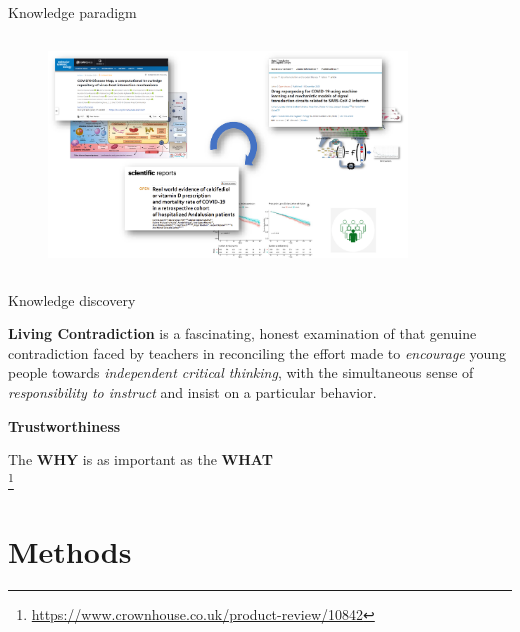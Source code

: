 \documentclass[compress,ignorenonframetext,aspectratio=1610,handout]{beamer}
\newcommand\blfootnote[1]{%
  \begingroup
  \renewcommand\thefootnote{}\footnote{\tiny{#1}}%
  \addtocounter{footnote}{-1}%
  \endgroup
}
\begin{document}
\begin{frame}{Knowledge paradigm}
	\begin{columns}
		\begin{figure}
			\includegraphics[width=0.85\textwidth]{figs/methods/knowdge_paradigm-crop.pdf}
		\end{figure}

	\end{columns}
\end{frame}



\begin{frame}{Knowledge discovery}

	\textbf{Living Contradiction} is a fascinating, honest examination of that genuine contradiction faced 
	by teachers in reconciling the effort made to \emph{encourage} young people towards \emph{independent 
	critical thinking}, with the simultaneous sense of \emph{responsibility to instruct} and insist 
	on a particular behavior. \\

	\vspace*{1em}

	\textbf{Trustworthiness} \\

	\vspace*{1em}

	The \textbf{WHY} is as important as the \textbf{WHAT} \\

	\blfootnote{\url{https://www.crownhouse.co.uk/product-review/10842}}

\end{frame}

\section{Methods}
\end{document}
